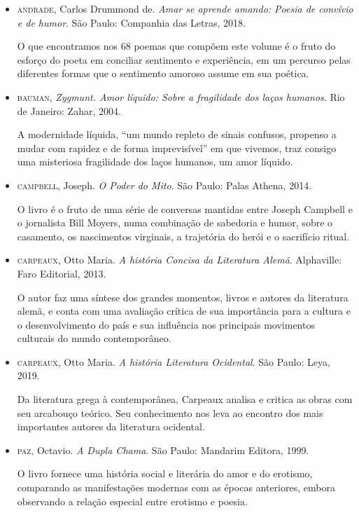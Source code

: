 \documentclass[12pt]{extarticle}
\begin{document}
\begin{itemize}

\item\textsc{andrade}, Carlos Drummond de. \textit{Amar se aprende amando: Poesia de
convívio e de humor}. São Paulo: Companhia das Letras, 2018.

O que encontramos nos 68 poemas que compõem este volume é o fruto do
esforço do poeta em conciliar sentimento e experiência, em um percurso
pelas diferentes formas que o sentimento amoroso assume em sua poética.

\item\textsc{bauman,} \textit{Zygmunt. Amor líquido: Sobre a fragilidade dos
laços humanos}. Rio de Janeiro: Zahar, 2004.

A modernidade líquida, ``um mundo repleto de sinais confusos, propenso a
mudar com rapidez e de forma imprevisível'' em que vivemos, traz consigo
uma misteriosa fragilidade dos laços humanos, um amor líquido.

\item\textsc{campbell}, Joseph. \textit{O Poder do Mito}. São Paulo: Palas Athena,
2014.

O livro é o fruto de uma série de conversas mantidas entre Joseph
Campbell e o jornalista Bill Moyers, numa combinação de sabedoria e
humor, sobre o casamento, os nascimentos virginais, a trajetória do
herói e o sacrifício ritual.

\item\textsc{carpeaux}, Otto Maria. \textit{A história Concisa da Literatura Alemã}.
Alphaville: Faro Editorial, 2013.

O autor faz uma síntese dos grandes momentos, livros e autores da
literatura alemã, e conta com uma avaliação crítica de sua importância
para a cultura e o desenvolvimento do país e sua influência nos
principais movimentos culturais do mundo contemporâneo.

\item\textsc{carpeaux}, Otto Maria. \textit{A história Literatura Ocidental}. São
Paulo: Leya, 2019.

Da literatura grega à contemporânea, Carpeaux analisa e critica as obras
com seu arcabouço teórico. Seu conhecimento nos leva ao encontro dos
mais importantes autores da literatura ocidental.

\item\textsc{paz}, Octavio. \textit{A Dupla Chama}. São Paulo: Mandarim Editora, 1999.

O livro fornece uma história social e literária do amor e do erotismo,
comparando as manifestações modernas com as épocas anteriores, embora
observando a relação especial entre erotismo e poesia.


\end{itemize}
\end{document}
